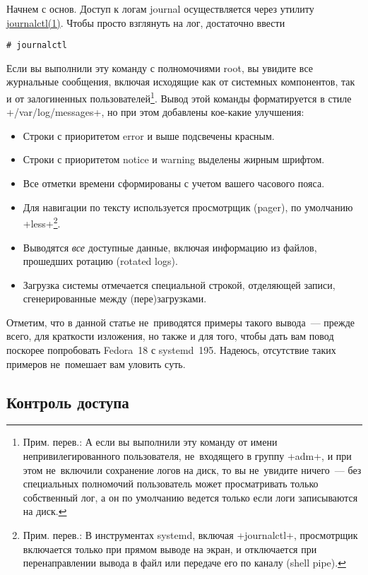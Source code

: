 \documentclass[10pt,oneside,a4paper]{article}
\begin{document}
Начнем с основ. Доступ к логам journal осуществляется через утилиту
\href{http://www.freedesktop.org/software/systemd/man/journalctl.html}{journalctl(1)}.
Чтобы просто взглянуть на лог, достаточно ввести
\begin{Verbatim}
# journalctl
\end{Verbatim}
Если вы выполнили эту команду с полномочиями root, вы увидите все
журнальные сообщения, включая исходящие как от системных компонентов, так и от
залогиненных пользователей\footnote{Прим. перев.: А если вы выполнили эту
команду от имени непривилегированного пользователя, не~входящего в группу
+adm+, и при этом не~включили сохранение логов на диск, то вы не~увидите
ничего~--- без специальных полномочий пользователь может просматривать только
собственный лог, а он по умолчанию ведется только если логи записываются на
диск.}. Вывод этой команды форматируется в стиле
+/var/log/messages+, но при этом добавлены кое-какие улучшения:
\begin{itemize}
	\item Строки с приоритетом error и выше подсвечены красным.
	\item Строки с приоритетом notice и warning выделены жирным шрифтом.
	\item Все отметки времени сформированы с учетом вашего часового пояса.
	\item Для навигации по тексту используется просмотрщик (pager), по
		умолчанию +less+\footnote{Прим. перев.: В инструментах systemd,
		включая +journalctl+, просмотрщик включается только при прямом 
		выводе на экран, и отключается при перенаправлении вывода в файл
		или передаче его по каналу (shell pipe).}.
	\item Выводятся \emph{все} доступные данные, включая информацию из
		файлов, прошедших ротацию (rotated logs).
	\item Загрузка системы отмечается специальной строкой, отделяющей
		записи, сгенерированные между (пере)загрузками.
\end{itemize}

Отметим, что в данной статье не~приводятся примеры такого вывода~--- прежде
всего, для краткости изложения, но также и для того, чтобы дать вам повод
поскорее попробовать Fedora~18 с systemd~195. Надеюсь, отсутствие таких примеров
не~помешает вам уловить суть.

\subsection{Контроль доступа}
\end{document}
